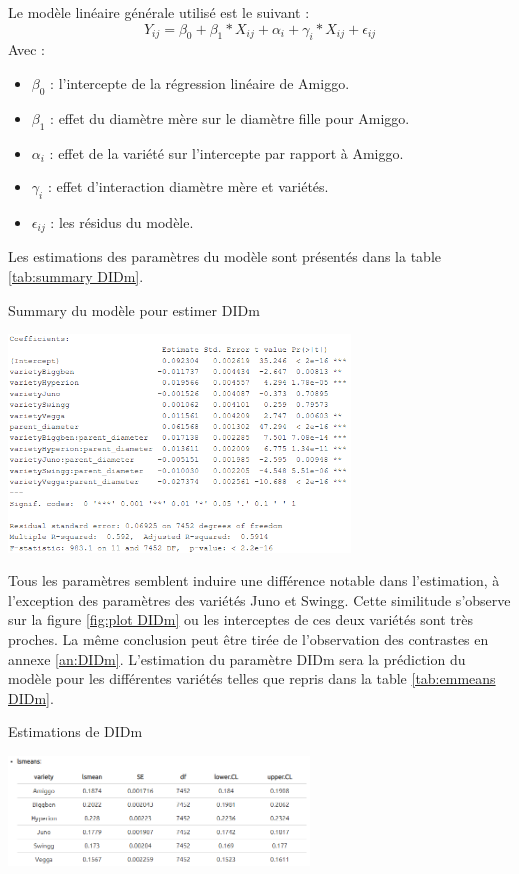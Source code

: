 Le modèle linéaire générale utilisé est le suivant : 
\begin{equation}
Y_{ij}=\beta_{0}+\beta_{1}*X_{ij}+\alpha_{i}+\gamma_{i}*X_{ij}+\epsilon_{ij}
\end{equation}
Avec : 
\begin{itemize}
    \item $\beta_{0}$ : l'intercepte de la régression linéaire de Amiggo.
    \item $\beta_{1}$ : effet du diamètre mère sur le diamètre fille pour Amiggo.
    \item $\alpha_{i}$ : effet de la variété sur l'intercepte par rapport à Amiggo.
    \item $\gamma_{i}$ : effet d'interaction diamètre mère et variétés.
    \item $\epsilon_{ij}$ : les résidus du modèle.
\end{itemize}

Les estimations des paramètres du modèle sont présentés dans la table \ref{tab:summary DIDm}.
\newpage

\begin{table}[ht]
    \centering
    \caption{Summary du modèle pour estimer DIDm}
    \includegraphics[width=0.68\textwidth]{Image/summary DIDm.png}
    \label{tab:summary DIDm}
\end{table}

Tous les paramètres semblent induire une différence notable dans l'estimation, à l'exception des paramètres des variétés Juno et Swingg.
Cette similitude s'observe sur la figure \ref{fig:plot DIDm} ou les interceptes de ces deux variétés sont très proches.
La même conclusion peut être tirée de l'observation des contrastes en annexe \ref{an:DIDm}.
L'estimation du paramètre DIDm sera la prédiction du modèle pour les différentes variétés telles que repris dans la table \ref{tab:emmeans DIDm}.

\begin{table}[ht]
    \centering
    \caption{Estimations de DIDm}
    \includegraphics[width=0.6\textwidth]{Image/lsmeans DIDm.png}
    \label{tab:emmeans DIDm}
\end{table}

